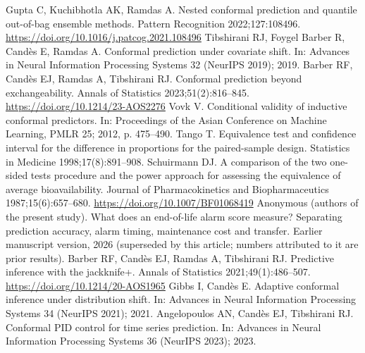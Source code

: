  Gupta C, Kuchibhotla AK, Ramdas A. Nested conformal prediction and quantile out-of-bag ensemble methods. Pattern Recognition 2022;127:108496. \url{https://doi.org/10.1016/j.patcog.2021.108496}
 Tibshirani RJ, Foygel Barber R, Cand\`es E, Ramdas A. Conformal prediction under covariate shift. In: Advances in Neural Information Processing Systems 32 (NeurIPS 2019); 2019.
 Barber RF, Cand\`es EJ, Ramdas A, Tibshirani RJ. Conformal prediction beyond exchangeability. Annals of Statistics 2023;51(2):816--845. \url{https://doi.org/10.1214/23-AOS2276}
 Vovk V. Conditional validity of inductive conformal predictors. In: Proceedings of the Asian Conference on Machine Learning, PMLR 25; 2012, p. 475--490.
 Tango T. Equivalence test and confidence interval for the difference in proportions for the paired-sample design. Statistics in Medicine 1998;17(8):891--908.
 Schuirmann DJ. A comparison of the two one-sided tests procedure and the power approach for assessing the equivalence of average bioavailability. Journal of Pharmacokinetics and Biopharmaceutics 1987;15(6):657--680. \url{https://doi.org/10.1007/BF01068419}
 Anonymous (authors of the present study). What does an end-of-life alarm score measure? Separating prediction accuracy, alarm timing, maintenance cost and transfer. Earlier manuscript version, 2026 (superseded by this article; numbers attributed to it are prior results).
 Barber RF, Cand\`es EJ, Ramdas A, Tibshirani RJ. Predictive inference with the jackknife+. Annals of Statistics 2021;49(1):486--507. \url{https://doi.org/10.1214/20-AOS1965}
 Gibbs I, Cand\`es E. Adaptive conformal inference under distribution shift. In: Advances in Neural Information Processing Systems 34 (NeurIPS 2021); 2021.
 Angelopoulos AN, Cand\`es EJ, Tibshirani RJ. Conformal PID control for time series prediction. In: Advances in Neural Information Processing Systems 36 (NeurIPS 2023); 2023.
